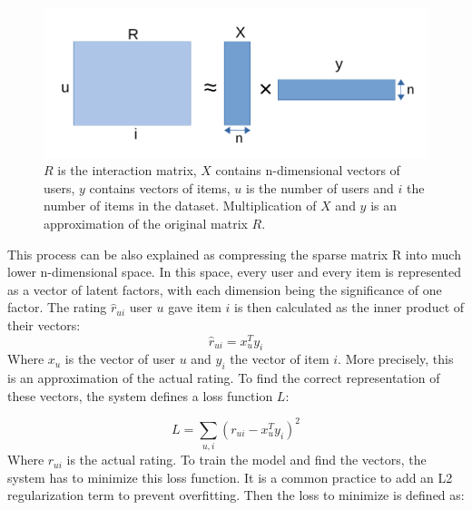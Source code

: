 \begin{figure}[H]
    \centering
    \includegraphics[scale=0.9]{obrazky-figures/factorization.pdf}
    \caption{$R$ is the interaction matrix, $X$ contains n-dimensional vectors of users, $y$ contains vectors of items, $u$ is the number of users and $i$ the number of items in the dataset. Multiplication of $X$ and $y$ is an approximation of the original matrix $R$. \cite{GoogleCloud}}
    \label{Factorization}
\end{figure}

This process can be also explained as compressing the sparse matrix R into much lower n-dimensional space. In this space, every user and every item is represented as a vector of latent factors, with each dimension being the significance of one factor. The rating $\hat{r}_{ui}$ user $u$ gave item $i$ is then calculated as the inner product of their vectors:
\begin{equation}
    \hat{r}_{ui} = x_{u}^T y_{i}
\end{equation}
Where $x_{u}$ is the vector of user $u$ and $y_i$ the vector of item $i$.
More precisely, this is an approximation of the actual rating. To find the correct representation of these vectors, the system defines a loss function $L$:

\begin{equation}
    L = \sum_{u,i} (r_{ui} - x_{u}^T y_{i})^2
\end{equation}
Where $r_{ui}$ is the actual rating.
To train the model and find the vectors, the system has to minimize this loss function. It is a common practice to add an L2 regularization term to prevent overfitting. Then the loss to minimize is defined as:

